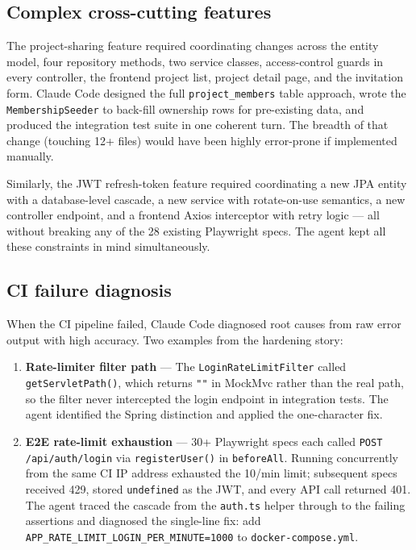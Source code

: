 \documentclass[a4paper, 12pt]{article}
\begin{document}
\subsection{Complex cross-cutting features}

The project-sharing feature required coordinating changes across the entity model, four
repository methods, two service classes, access-control guards in every controller, the
frontend project list, project detail page, and the invitation form. Claude Code designed the
full \texttt{project\_members} table approach, wrote the \texttt{MembershipSeeder} to
back-fill ownership rows for pre-existing data, and produced the integration test suite in
one coherent turn. The breadth of that change (touching 12+ files) would have been highly
error-prone if implemented manually.

Similarly, the JWT refresh-token feature required coordinating a new JPA entity with a
database-level cascade, a new service with rotate-on-use semantics, a new controller
endpoint, and a frontend Axios interceptor with retry logic --- all without breaking any of
the 28 existing Playwright specs. The agent kept all these constraints in mind simultaneously.

\subsection{CI failure diagnosis}

When the CI pipeline failed, Claude Code diagnosed root causes from raw error output with
high accuracy. Two examples from the hardening story:

\begin{enumerate}
  \item \textbf{Rate-limiter filter path} --- The \texttt{LoginRateLimitFilter} called
        \texttt{getServletPath()}, which returns \texttt{""} in MockMvc rather than the
        real path, so the filter never intercepted the login endpoint in integration tests.
        The agent identified the Spring distinction and applied the one-character fix.
  \item \textbf{E2E rate-limit exhaustion} --- 30+ Playwright specs each called
        \texttt{POST /api/auth/login} via \texttt{registerUser()} in \texttt{beforeAll}.
        Running concurrently from the same CI IP address exhausted the 10/min limit;
        subsequent specs received 429, stored \texttt{undefined} as the JWT, and every API
        call returned 401. The agent traced the cascade from the \texttt{auth.ts} helper
        through to the failing assertions and diagnosed the single-line fix: add
        \texttt{APP\_RATE\_LIMIT\_LOGIN\_PER\_MINUTE=1000} to \texttt{docker-compose.yml}.
\end{enumerate}
\end{document}
